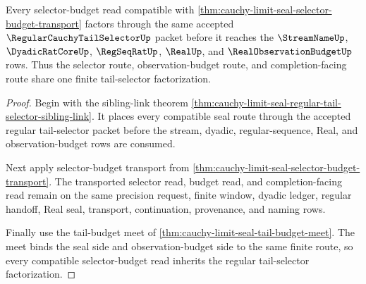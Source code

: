 \begin{theorem}
\label{thm:cauchy-limit-seal-regular-tail-selector-budget-compatibility}
Every selector-budget read compatible with \autoref{thm:cauchy-limit-seal-selector-budget-transport} factors through the same accepted $\RegularCauchyTailSelectorUp$ packet before it reaches the $\StreamNameUp$, $\DyadicRatCoreUp$, $\RegSeqRatUp$, $\RealUp$, and $\RealObservationBudgetUp$ rows. Thus the selector route, observation-budget route, and completion-facing route share one finite tail-selector factorization.
\end{theorem}
\begin{proof}
Begin with the sibling-link theorem \autoref{thm:cauchy-limit-seal-regular-tail-selector-sibling-link}. It places every compatible seal route through the accepted regular tail-selector packet before the stream, dyadic, regular-sequence, Real, and observation-budget rows are consumed.

Next apply selector-budget transport from \autoref{thm:cauchy-limit-seal-selector-budget-transport}. The transported selector read, budget read, and completion-facing read remain on the same precision request, finite window, dyadic ledger, regular handoff, Real seal, transport, continuation, provenance, and naming rows.

Finally use the tail-budget meet of \autoref{thm:cauchy-limit-seal-tail-budget-meet}. The meet binds the seal side and observation-budget side to the same finite route, so every compatible selector-budget read inherits the regular tail-selector factorization.
\end{proof}

